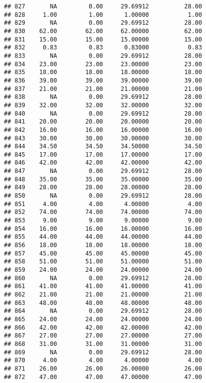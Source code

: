 \documentclass[
]{article}
\begin{document}
\begin{verbatim}
## 827       NA         0.00     29.69912          28.00
## 828     1.00         1.00      1.00000           1.00
## 829       NA         0.00     29.69912          28.00
## 830    62.00        62.00     62.00000          62.00
## 831    15.00        15.00     15.00000          15.00
## 832     0.83         0.83      0.83000           0.83
## 833       NA         0.00     29.69912          28.00
## 834    23.00        23.00     23.00000          23.00
## 835    18.00        18.00     18.00000          18.00
## 836    39.00        39.00     39.00000          39.00
## 837    21.00        21.00     21.00000          21.00
## 838       NA         0.00     29.69912          28.00
## 839    32.00        32.00     32.00000          32.00
## 840       NA         0.00     29.69912          28.00
## 841    20.00        20.00     20.00000          20.00
## 842    16.00        16.00     16.00000          16.00
## 843    30.00        30.00     30.00000          30.00
## 844    34.50        34.50     34.50000          34.50
## 845    17.00        17.00     17.00000          17.00
## 846    42.00        42.00     42.00000          42.00
## 847       NA         0.00     29.69912          28.00
## 848    35.00        35.00     35.00000          35.00
## 849    28.00        28.00     28.00000          28.00
## 850       NA         0.00     29.69912          28.00
## 851     4.00         4.00      4.00000           4.00
## 852    74.00        74.00     74.00000          74.00
## 853     9.00         9.00      9.00000           9.00
## 854    16.00        16.00     16.00000          16.00
## 855    44.00        44.00     44.00000          44.00
## 856    18.00        18.00     18.00000          18.00
## 857    45.00        45.00     45.00000          45.00
## 858    51.00        51.00     51.00000          51.00
## 859    24.00        24.00     24.00000          24.00
## 860       NA         0.00     29.69912          28.00
## 861    41.00        41.00     41.00000          41.00
## 862    21.00        21.00     21.00000          21.00
## 863    48.00        48.00     48.00000          48.00
## 864       NA         0.00     29.69912          28.00
## 865    24.00        24.00     24.00000          24.00
## 866    42.00        42.00     42.00000          42.00
## 867    27.00        27.00     27.00000          27.00
## 868    31.00        31.00     31.00000          31.00
## 869       NA         0.00     29.69912          28.00
## 870     4.00         4.00      4.00000           4.00
## 871    26.00        26.00     26.00000          26.00
## 872    47.00        47.00     47.00000          47.00

\end{verbatim}
\end{document}
